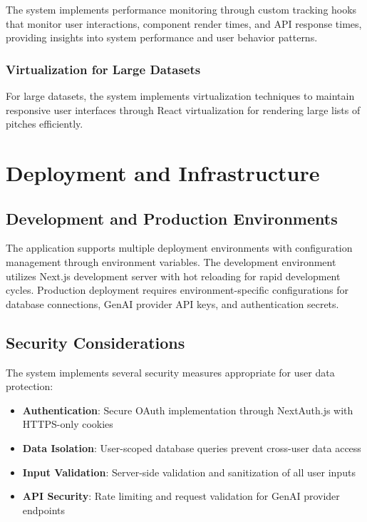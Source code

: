 The system implements performance monitoring through custom tracking hooks that monitor user interactions, component render times, and API response times, providing insights into system performance and user behavior patterns.

\subsubsection{Virtualization for Large Datasets}
For large datasets, the system implements virtualization techniques to maintain responsive user interfaces through React virtualization for rendering large lists of pitches efficiently.



\section{Deployment and Infrastructure}

\subsection{Development and Production Environments}
The application supports multiple deployment environments with configuration management through environment variables. The development environment utilizes Next.js development server with hot reloading for rapid development cycles. Production deployment requires environment-specific configurations for database connections, GenAI provider API keys, and authentication secrets.


\subsection{Security Considerations}
The system implements several security measures appropriate for user data protection:
\begin{itemize}
  \item \textbf{Authentication}: Secure OAuth implementation through NextAuth.js with HTTPS-only cookies
  \item \textbf{Data Isolation}: User-scoped database queries prevent cross-user data access
  \item \textbf{Input Validation}: Server-side validation and sanitization of all user inputs
  \item \textbf{API Security}: Rate limiting and request validation for GenAI provider endpoints
\end{itemize}






